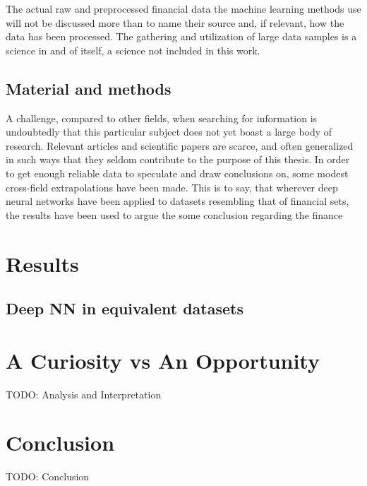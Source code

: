 The actual raw and preprocessed financial data the machine learning methods use will not be discussed more than to name their source and, if relevant, how the data has been processed. The gathering and utilization of large data samples is a science in and of itself, a science not included in this work.


\subsection{Material and methods}


A challenge, compared to other fields, when searching for information is undoubtedly that this particular subject does not yet boast a large body of research. Relevant articles and scientific papers are scarce, and often generalized in such ways that they seldom contribute to the purpose of this thesis. In order to get enough reliable data to speculate and draw conclusions on, some modest cross-field extrapolations have been made. This is to say, that wherever deep neural networks have been applied to datasets resembling that of financial sets, the results have been used to argue the some conclusion regarding the finance


\newpage

\section{Results}
\subsection{Deep NN in equivalent datasets}


\newpage

\section{A Curiosity vs An Opportunity}
TODO: Analysis and Interpretation

\newpage

\section{Conclusion}
TODO: Conclusion
